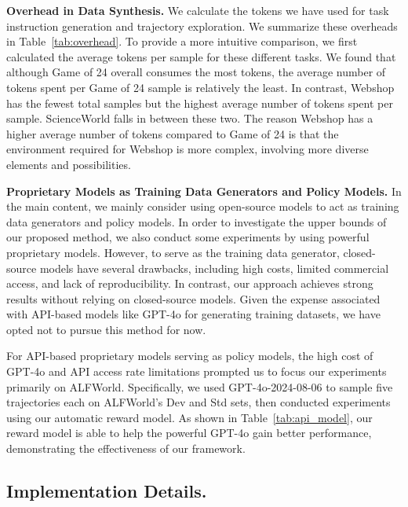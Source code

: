 \textbf{Overhead in Data Synthesis.}
We calculate the tokens we have used for task instruction generation and trajectory exploration. We summarize these overheads in Table~\ref{tab:overhead}. To provide a more intuitive comparison, we first calculated the average tokens per sample for these different tasks. We found that although Game of 24 overall consumes the most tokens, the average number of tokens spent per Game of 24 sample is relatively the least. In contrast, Webshop has the fewest total samples but the highest average number of tokens spent per sample. ScienceWorld falls in between these two. The reason Webshop has a higher average number of tokens compared to Game of 24 is that the environment required for Webshop is more complex, involving more diverse elements and possibilities.


\textbf{Proprietary Models as Training Data Generators and Policy Models.}
In the main content, we mainly consider using open-source models to act as training data generators and policy models. In order to investigate the upper bounds of our proposed method, we also conduct some experiments by using powerful proprietary models. However, to serve as the training data generator, closed-source models have several drawbacks, including high costs, limited commercial access, and lack of reproducibility. In contrast, our approach achieves strong results without relying on closed-source models. Given the expense associated with API-based models like GPT-4o for generating training datasets, we have opted not to pursue this method for now.

For API-based proprietary models serving as policy models, the high cost of GPT-4o and API access rate limitations prompted us to focus our experiments primarily on ALFWorld. Specifically, we used GPT-4o-2024-08-06 to sample five trajectories each on ALFWorld’s Dev and Std sets, then conducted experiments using our automatic reward model. As shown in Table~\ref{tab:api_model},  our reward model is able to help the powerful GPT-4o gain better performance, demonstrating the effectiveness of our framework.


\subsection{Implementation Details.}
\label{sec:llmapi}
